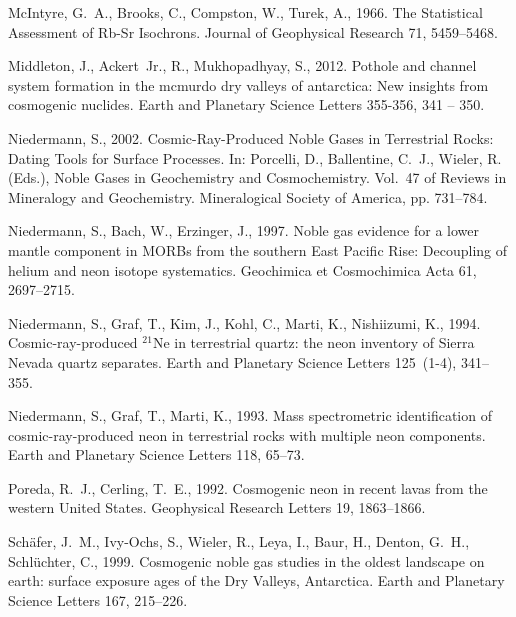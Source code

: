 \documentclass[authoryear,review,12pt]{elsarticle}
\begin{document}
\begin{thebibliography}{27}
{McIntyre}, G.~A., {Brooks}, C., {Compston}, W., {Turek}, A., 1966. {The
  Statistical Assessment of Rb-Sr Isochrons}. Journal of Geophysical Research
  71, 5459--5468.

Middleton, J., Ackert~Jr., R., Mukhopadhyay, S., 2012. Pothole and channel
  system formation in the mcmurdo dry valleys of antarctica: New insights from
  cosmogenic nuclides. Earth and Planetary Science Letters 355-356, 341 -- 350.

Niedermann, S., 2002. {Cosmic-Ray-Produced Noble Gases in Terrestrial Rocks:
  Dating Tools for Surface Processes}. In: Porcelli, D., Ballentine, C.~J.,
  Wieler, R. (Eds.), {Noble Gases in Geochemistry and Cosmochemistry}. Vol.~47
  of Reviews in Mineralogy and Geochemistry. Mineralogical Society of America,
  pp. 731--784.

Niedermann, S., Bach, W., Erzinger, J., 1997. Noble gas evidence for a lower
  mantle component in {MORB}s from the southern {E}ast {P}acific {R}ise:
  {D}ecoupling of helium and neon isotope systematics. Geochimica et
  Cosmochimica Acta 61, 2697--2715.

Niedermann, S., Graf, T., Kim, J., Kohl, C., Marti, K., Nishiizumi, K., 1994.
  Cosmic-ray-produced $^{21}${N}e in terrestrial quartz: the neon inventory of
  {S}ierra {N}evada quartz separates. Earth and Planetary Science Letters
  125~(1-4), 341--355.

Niedermann, S., Graf, T., Marti, K., 1993. {Mass spectrometric identification
  of cosmic-ray-produced neon in terrestrial rocks with multiple neon
  components}. Earth and Planetary Science Letters 118, 65--73.

{Poreda}, R.~J., {Cerling}, T.~E., 1992. {Cosmogenic neon in recent lavas from
  the western United States}. Geophysical Research Letters 19, 1863--1866.

{Sch{\"a}fer}, J.~M., {Ivy-Ochs}, S., {Wieler}, R., {Leya}, I., {Baur}, H.,
  {Denton}, G.~H., {Schl{\"u}chter}, C., 1999. {Cosmogenic noble gas studies in
  the oldest landscape on earth: surface exposure ages of the Dry Valleys,
  Antarctica}. Earth and Planetary Science Letters 167, 215--226.


\end{thebibliography}
\end{document}
